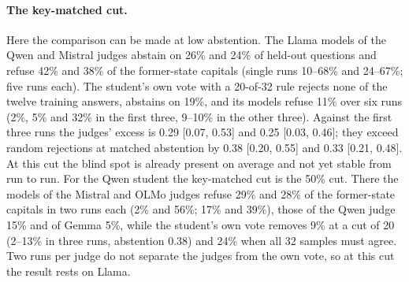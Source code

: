 \documentclass[11pt,a4paper,twocolumn]{article}
\begin{document}
\paragraph{The key-matched cut.} Here the comparison can be made at low abstention. The Llama models of the Qwen and Mistral judges abstain on 26\% and 24\% of held-out questions and refuse 42\% and 38\% of the former-state capitals (single runs 10--68\% and 24--67\%; five runs each). The student's own vote with a 20-of-32 rule rejects none of the twelve training answers, abstains on 19\%, and its models refuse 11\% over six runs (2\%, 5\% and 32\% in the first three, 9--10\% in the other three). Against the first three runs the judges' excess is 0.29 [0.07, 0.53] and 0.25 [0.03, 0.46]; they exceed random rejections at matched abstention by 0.38 [0.20, 0.55] and 0.33 [0.21, 0.48]. At this cut the blind spot is already present on average and not yet stable from run to run. For the Qwen student the key-matched cut is the 50\% cut. There the models of the Mistral and OLMo judges refuse 29\% and 28\% of the former-state capitals in two runs each (2\% and 56\%; 17\% and 39\%), those of the Qwen judge 15\% and of Gemma 5\%, while the student's own vote removes 9\% at a cut of 20 (2--13\% in three runs, abstention 0.38) and 24\% when all 32 samples must agree. Two runs per judge do not separate the judges from the own vote, so at this cut the result rests on Llama.
\end{document}
